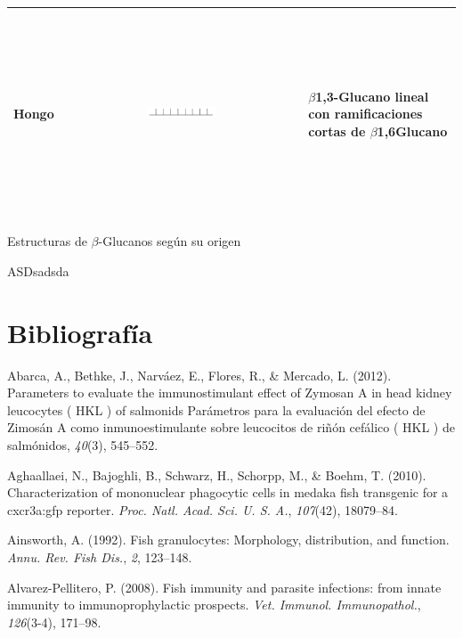 \documentclass[11pt,a4paper,]{article}
\begin{document}
\begin{table}[h]
\begin{center}
\begin{threeparttable}
\begin{tabular}{l c l}
Hongo & \includegraphics[width=0.3\textwidth, height=60mm]{bghongo} & $\beta$1,3-Glucano lineal con ramificaciones cortas de $\beta$1,6Glucano \\

\bottomrule
\end{tabular}
\begin{tablenotes}
    \item Estructuras de $\beta$-Glucanos según su origen
\end{tablenotes}
\end{threeparttable}
\end{center}
\end{table}

ASDsadsda

\clearpage

\section*{Bibliografía}\label{bibliografuxeda}

Abarca, A., Bethke, J., Narváez, E., Flores, R., \& Mercado, L. (2012).
Parameters to evaluate the immunostimulant effect of Zymosan A in head
kidney leucocytes ( HKL ) of salmonids Parámetros para la evaluación del
efecto de Zimosán A como inmunoestimulante sobre leucocitos de riñón
cefálico ( HKL ) de salmónidos, \emph{40}(3), 545--552.

Aghaallaei, N., Bajoghli, B., Schwarz, H., Schorpp, M., \& Boehm, T.
(2010). Characterization of mononuclear phagocytic cells in medaka fish
transgenic for a cxcr3a:gfp reporter. \emph{Proc. Natl. Acad. Sci. U. S.
A.}, \emph{107}(42), 18079--84.

Ainsworth, A. (1992). Fish granulocytes: Morphology, distribution, and
function. \emph{Annu. Rev. Fish Dis.}, \emph{2}, 123--148.

Alvarez-Pellitero, P. (2008). Fish immunity and parasite infections:
from innate immunity to immunoprophylactic prospects. \emph{Vet.
Immunol. Immunopathol.}, \emph{126}(3-4), 171--98.
\end{document}
